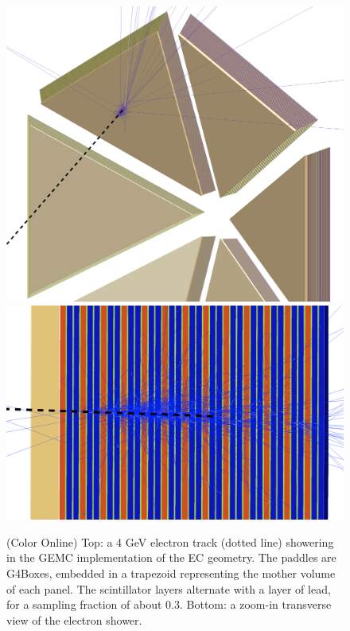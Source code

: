 \begin{figure}
	\centering
	\includegraphics[width=0.99\columnwidth,keepaspectratio]{img/ecGeometry.png}
	\includegraphics[width=0.99\columnwidth,keepaspectratio]{img/ecDetail.png}
	\caption{(Color Online) Top: a 4 GeV electron track (dotted line) showering in the GEMC implementation of the EC geometry.
            The paddles are G4Boxes, embedded in a trapezoid representing the mother volume of each panel.
            The scintillator layers alternate with a layer of lead, for a sampling fraction of about 0.3.
            Bottom: a zoom-in transverse view of the electron shower.}
	\label{fig:ecGeometry}
\end{figure}

